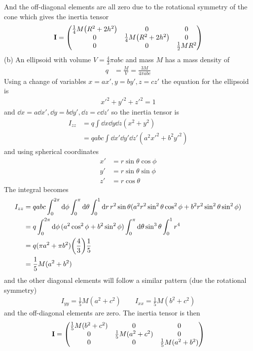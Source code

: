 \documentclass[../hw.tex]{subfiles}
\begin{document}
And the off-diagonal elements are all zero due to the rotational symmetry of the cone which gives 
the inertia tensor
\begin{align*}
    \vb I = \mqty(\frac{1}{4} M \qt(R^2 + 2h^2) & 0 & 0 \\
        0 & \frac{1}{4} M \qt(R^2 + 2h^2) & 0 \\
        0 & 0 & \frac{1}{2} M R^2)
\end{align*}
\newpage
(b) An ellipsoid with volume $V = \frac{4}{3} \pi a b c$ and mass $M$ has a mass density of
\begin{align*}
    q &= \frac{M}{V} = \frac{3M}{4\pi abc}
\end{align*}
Using a change of variables $x = a x', y = b y', z = c z'$ the equation for the ellipsoid is
\begin{align*}
    x'^2 + y'^2 + z'^2 = 1
\end{align*}
and $\dd{x} = a \dd{x'}, \dd{y} = b \dd{y'}, \dd{z} = c \dd{z'}$ so the inertia tensor is
\begin{align*}
    I_{zz} &= q \int \dd{x} \dd{y} \dd{z} (x^2 + y^2) \\
    &= qabc \int \dd{x'} \dd{y'} \dd{z'} (a^2 x'^2 + b^2 y'^2)
\end{align*}
and using spherical coordinates 
\begin{align*}
    x' &= r \sin\theta \cos\phi \\
    y' &= r \sin\theta \sin\phi \\
    z' &= r \cos\theta
\end{align*}
The integral becomes
\begin{align*}
    I_{zz} &= qabc \int_0^{2\pi} \dd{\phi} \int_0^\pi \dd{\theta} \int_0^1 \dd{r} r^2 \sin\theta 
        (a^2 r^2 \sin^2\theta \cos^2\phi + b^2 r^2 \sin^2\theta \sin^2\phi) \\
    &= q \int_0^{2\pi} \dd{\phi} (a^2 \cos^2\phi + b^2 \sin^2\phi) \int_0^\pi \dd{\theta} \sin^3\theta 
    \int_0^1 r^4 \\
    &= q (\pi a^2 + \pi b^2) \qt(\frac{4}{3}) \frac{1}{5} \\
    &= \frac{1}{5} M (a^2 + b^2)
\end{align*}
and the other diagonal elements will follow a similar pattern (due the rotational symmetry)
\begin{align*}
    I_{yy} = \frac{1}{5} M (a^2 + c^2) \qquad I_{xx} = \frac{1}{5} M (b^2 + c^2)
\end{align*}
and the off-diagonal elements are zero. The inertia tensor is then
\begin{align*}
    \vb I = \mqty(\frac{1}{5} M (b^2 + c^2) & 0 & 0 \\
        0 & \frac{1}{5} M (a^2 + c^2) & 0 \\
        0 & 0 & \frac{1}{5} M (a^2 + b^2))
\end{align*}
\end{document}
